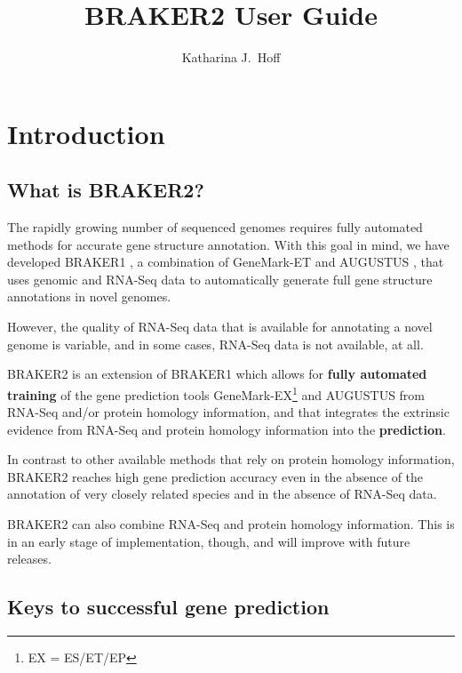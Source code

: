 \documentclass[a4paper,10pt]{report}
\title{BRAKER2 User Guide}
\author{Katharina J.~Hoff}
\begin{document}
\maketitle

\tableofcontents

\chapter{Introduction}

\section{What is BRAKER2?}

The rapidly growing number of sequenced genomes requires fully automated methods for accurate gene structure annotation. With this goal in mind, we have developed BRAKER1 \cite{braker1}, a combination of GeneMark-ET \cite{GeneMark-ET} and AUGUSTUS \cite{AUGUSTUS}, that uses genomic and RNA-Seq data to automatically generate full gene structure annotations in novel genomes.

However, the quality of RNA-Seq data that is available for annotating a novel genome is variable, and in some cases, RNA-Seq data is not available, at all.

BRAKER2 is an extension of BRAKER1 which allows for \textbf{fully automated training} of the gene prediction tools GeneMark-EX\footnote{EX = ES/ET/EP} and AUGUSTUS from RNA-Seq and/or protein homology information, and that integrates the extrinsic evidence from RNA-Seq and protein homology information into the \textbf{prediction}.

In contrast to other available methods that rely on protein homology information, BRAKER2 reaches high gene prediction accuracy even in the absence of the annotation of very closely related species and in the absence of RNA-Seq data. 

BRAKER2 can also combine RNA-Seq and protein homology information. This is in an early stage of implementation, though, and will improve with future releases.

\section{Keys to successful gene prediction}
\end{document}
